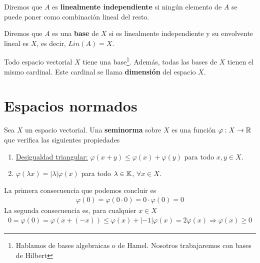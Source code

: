 \begin{definicion}
    Diremos que $A$ es \textbf{linealmente independiente} si ningún elemento de $A$ se puede poner como combinación lineal del resto.
\end{definicion}

\begin{definicion}
    Diremos que $A$ es una \textbf{base} de $X$ si es linealmente independiente y su envolvente lineal es $X$, es decir, $Lin(A)=X$.
\end{definicion}

\begin{definicion}
    Todo espacio vectorial $X$ tiene una base\footnote{Hablamos de bases algebraicas o de Hamel. Nosotros trabajaremos con bases de Hilbert}. Además, todas las bases de $X$ tienen el mismo cardinal. Este cardinal se llama \textbf{dimensión} del espacio $X$.
\end{definicion}

\section{Espacios normados}

\begin{definicion}
    Sea $X$ un espacio vectorial. Una \textbf{seminorma} sobre $X$ es una función $\varphi: X \to \mathbb{R}$ que verifica las siguientes propiedades
    \begin{enumerate}
        \item \underline{Desigualdad triangular:} $\varphi(x+y) \leq \varphi(x) + \varphi(y)$ para todo $x,y\in X$.
        \item $\varphi(\lambda x) = |\lambda|\varphi(x)$ para todo $\lambda \in \mathbb{K}$, $\forall x \in X$.
    \end{enumerate}
\end{definicion}

\begin{observacion}
    La primera consecuencia que podemos concluir es 
    \begin{gather*}
        \varphi(0) = \varphi(0 \cdot 0) = 0 \cdot \varphi(0) = 0
    \end{gather*}
    La segunda consecuencia es, para cualquier $x\in X$
    \begin{gather*}
        0 =\varphi(0) = \varphi(x + (-x)) \leq \varphi(x) + |-1|\varphi(x) = 2\varphi(x) \Rightarrow \varphi(x) \geq 0
    \end{gather*}
\end{observacion}

